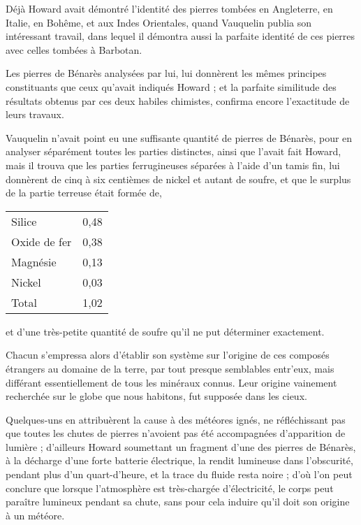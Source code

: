 \documentclass[a4paper, 12pt, oneside, french]{article}
\begin{document}
Déjà Howard avait démontré l'identité des pierres tombées en Angleterre, en Italie, en Bohême, et aux Indes Orientales, quand Vauquelin publia son intéressant travail, dans lequel il démontra aussi la parfaite identité de ces pierres avec celles tombées à Barbotan.

Les pierres de Bénarès analysées par lui, lui donnèrent les mêmes principes constituants que ceux qu'avait indiqués Howard ; et la parfaite similitude des résultats obtenus par ces deux habiles chimistes, confirma encore l'exactitude de leurs travaux.

Vauquelin n'avait point eu une suffisante quantité de pierres de Bénarès, pour en analyser séparément toutes les parties distinctes, ainsi que l'avait fait Howard, mais il trouva que les parties ferrugineuses séparées à l'aide d'un tamis fin, lui donnèrent de cinq à six centièmes de nickel et autant de soufre, et que le surplus de la partie terreuse était formée de,
\begin{table}[H]
    \centering
    \Fontauri
    \large
    \begin{tabular}{l r}
        Silice & 0,48 \\
        Oxide de fer & 0,38 \\
        Magnésie & 0,13 \\
        Nickel & 0,03 \\ \hline
        Total & 1,02 \\
    \end{tabular}
\end{table}
et d'une très-petite quantité de soufre qu'il ne put déterminer exactement.

Chacun s'empressa alors d'établir son système sur l'origine de ces composés étrangers au domaine de la terre, par tout presque semblables entr'eux, mais différant essentiellement de tous les minéraux connus. Leur origine vainement recherchée sur le globe que nous habitons, fut supposée dans les cieux.

Quelques-uns en attribuèrent la cause à des météores ignés, ne réfléchissant pas que toutes les chutes de pierres n'avoient pas été accompagnées d'apparition de lumière ; d'ailleurs Howard soumettant un fragment d'une des pierres de Bénarès, à la décharge d'une forte batterie électrique, la rendit lumineuse dans l'obscurité, pendant plus d'un quart-d'heure, et la trace du fluide resta noire ; d'où l'on peut conclure que lorsque l'atmosphère est très-chargée d'électricité, le corps peut paraître lumineux pendant sa chute, sans pour cela induire qu'il doit son origine à un météore.
\end{document}
